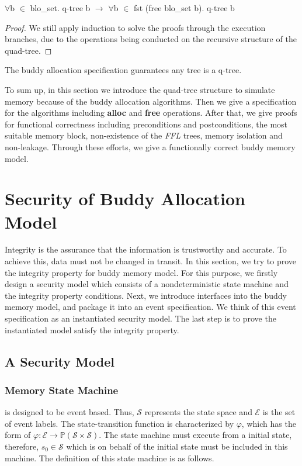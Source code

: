 \documentclass[runningheads]{llncs}
\begin{document}
\begin{lemma}
$\forall$b $\in$ blo\_set. q-tree b $\longrightarrow$ $\forall$b $\in$ fst (free blo\_set b). q-tree b
\end{lemma}

\begin{proof}
We still apply induction to solve the proofs through the execution branches, due to the operations being conducted on the recursive structure of the quad-tree.
\end{proof}

\begin{theorem}
The buddy allocation specification guarantees any tree is a q-tree.
\end{theorem}

To sum up, in this section we introduce the quad-tree structure to simulate memory because of the buddy allocation algorithms. Then we give a specification for the algorithms including \textbf{alloc} and \textbf{free} operations. After that, we give proofs for functional correctness including preconditions and postconditions, the most suitable memory block, non-existence of the \textsl{FFL} trees, memory isolation and non-leakage. Through these efforts, we give a functionally correct buddy memory model.


\section{Security of Buddy Allocation Model}
Integrity is the assurance that the information is trustworthy and accurate. To achieve this, data must not be changed in transit. In this section, we try to prove the integrity property for buddy memory model. For this purpose, we firstly design a security model which consists of a nondeterministic state machine and the integrity property conditions. Next, we introduce interfaces into the buddy memory model, and package it into an event specification. We think of this event specification as an instantiated security model. The last step is to prove the instantiated model satisfy the integrity property.

\subsection{A Security Model}

\subsubsection{Memory State Machine} is designed to be event based. Thus, $\mathcal{S}$ represents the state space and $\mathcal{E}$ is the set of event labels. The state-transition function is characterized by $\varphi$, which has the form of $\varphi: \mathcal{E} \rightarrow \mathbb{P}(\mathcal{S} \times \mathcal{S})$. The state machine must execute from a initial state, therefore, $s_0 \in \mathcal{S}$ which is on behalf of the initial state must be included in this machine. The definition of this state machine is as follows.
\end{document}
